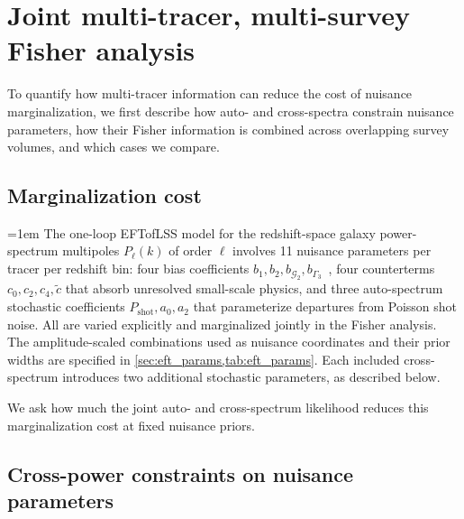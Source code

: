 \documentclass[a4paper,11pt]{article}
\newcommand{\revchange}[1]{{\color{RevisionColor}#1}}
\newcommand{\G}{\mathcal{G}}
\newcommand{\ctilde}{\tilde{c}}
\newcommand{\Pshot}{P_{\mathrm{shot}}}
\begin{document}
\section{Joint multi-tracer, multi-survey Fisher analysis}
\label{sec:method}

\revchange{To quantify how multi-tracer information can reduce the cost of nuisance
marginalization, we first describe how auto- and cross-spectra constrain nuisance parameters,
how their Fisher information is combined across overlapping survey
volumes, and which cases we compare.}

\subsection{Marginalization cost}
\label{sec:marg_cost}

\revchange{\emergencystretch=1em
The one-loop EFTofLSS model for the redshift-space galaxy power-spectrum
multipoles $P_\ell(k)$ of order $\ell$ involves 11 nuisance parameters per tracer
per redshift bin: four bias coefficients
$b_1,b_2,b_{\G_2},b_{\Gamma_3}$~\cite{Desjacques:2016bnm}, four counterterms
$c_0,c_2,c_4,\ctilde$ that absorb unresolved small-scale physics, and
three auto-spectrum stochastic coefficients $\Pshot,a_0,a_2$ that
parameterize departures from Poisson shot noise.
All are varied explicitly and marginalized jointly in the Fisher analysis.
The amplitude-scaled combinations used as nuisance coordinates and their
prior widths are specified in \cref{sec:eft_params,tab:eft_params}.
Each included cross-spectrum introduces two additional stochastic
parameters, as described below.\par}

\revchange{We ask how much the joint auto- and cross-spectrum likelihood reduces
this marginalization cost at fixed nuisance priors.}


\subsection{Cross-power constraints on nuisance parameters}
\label{sec:cross_power}
\end{document}
